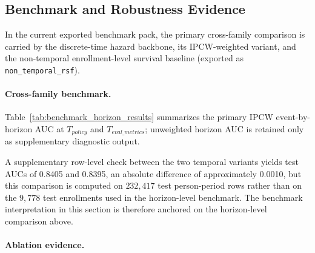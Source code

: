 \subsection{Benchmark and Robustness Evidence}
\label{subsec:benchmark_robust_results}

In the current exported benchmark pack, the primary cross-family comparison is carried by the discrete-time hazard backbone, its IPCW-weighted variant, and the non-temporal enrollment-level survival baseline (exported as \texttt{non\_temporal\_rsf}).

\paragraph*{Cross-family benchmark.}
Table~\ref{tab:benchmark_horizon_results} summarizes the primary IPCW event-by-horizon AUC at $T_{policy}$ and $T_{eval\_metrics}$; unweighted horizon AUC is retained only as supplementary diagnostic output.

\begin{table}[!t]
\centering
\caption{Cross-family IPCW benchmark at reported horizons (primary comparison).}
\label{tab:benchmark_horizon_results}
\small
{}
\end{table}

A supplementary row-level check between the two temporal variants yields test AUCs of 0.8405 and 0.8395, an absolute difference of approximately 0.0010, but this comparison is computed on $232{,}417$ test person-period rows rather than on the $9{,}778$ test enrollments used in the horizon-level benchmark. The benchmark interpretation in this section is therefore anchored on the horizon-level comparison above.

\paragraph*{Ablation evidence.}
\begin{table}[!t]
\centering
\caption{Ablation at $T_{eval\_metrics}=37$ (re-trained variants).}
\label{tab:ablation_results}
\end{table}

